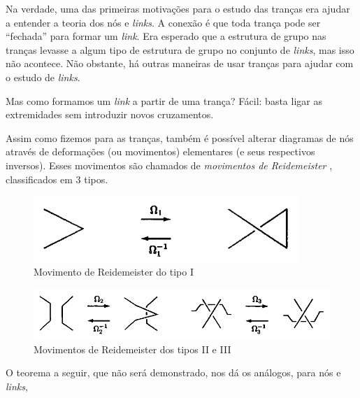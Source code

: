 	\par\vspace{0.3cm} Na verdade, uma das primeiras motivações para o estudo das tranças era ajudar 
	a entender a teoria dos nós e \textit{links}. A conexão é que toda trança pode ser ``fechada'' 
	para formar um \textit{link}. Era esperado que a estrutura de grupo nas tranças levasse a algum 
	tipo de estrutura de grupo no conjunto de \textit{links}, mas isso não acontece. Não obstante, 
	há outras maneiras de usar tranças para ajudar com o estudo de \textit{links}.
	
	\par\vspace{0.3cm} Mas como formamos um \textit{link} a partir de uma trança? Fácil: basta 
	ligar as extremidades sem introduzir novos cruzamentos.
	
	\par\vspace{0.3cm} Assim como fizemos para as tranças, também é possível alterar diagramas de 
	nós através de deformações (ou movimentos) elementares (e seus respectivos inversos). 
	Esses movimentos são chamados de \textit{movimentos de Reidemeister}
	, classificados em 3 tipos.
	\begin{figure}[H]
		\begin{center}
			\includegraphics[width=10cm]{Images/reidemeister_1.png}
		\end{center}\caption{Movimento de Reidemeister do tipo I}
		\label{reidemeister tipo 1}
	\end{figure}
	\begin{figure}[H]
		\begin{center}
			\includegraphics[width=14cm]{Images/reidemeister_2_e_3.png}
		\end{center}\caption{Movimentos de Reidemeister dos tipos II e III}
		\label{reidemeister tipos 2 e 3}
	\end{figure}
	O teorema a seguir, que não será demonstrado, nos dá os análogos, para nós e \textit{links}, 
